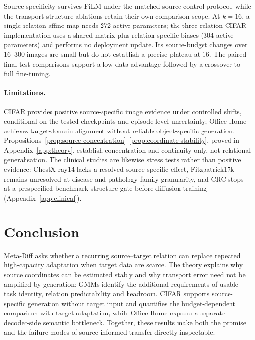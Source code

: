 \documentclass{article}
\begin{document}
Source specificity survives FiLM under the matched source-control protocol, while the transport-structure ablations retain their own comparison scope. At $k=16$, a single-relation affine map needs 272 active parameters; the three-relation CIFAR implementation uses a shared matrix plus relation-specific biases (304 active parameters) and performs no deployment update. Its source-budget changes over 16--300 images are small but do not establish a precise plateau at 16. The paired final-test comparisons support a low-data advantage followed by a crossover to full fine-tuning.

\paragraph{Limitations.}
CIFAR provides positive source-specific image evidence under controlled shifts, conditional on the tested checkpoints and episode-level uncertainty; Office-Home achieves target-domain alignment without reliable object-specific generation. Propositions~\ref{prop:source-concentration}--\ref{prop:coordinate-stability}, proved in Appendix~\ref{app:theory}, establish concentration and continuity only, not relational generalisation. The clinical studies are likewise stress tests rather than positive evidence: ChestX-ray14 lacks a resolved source-specific effect, Fitzpatrick17k remains unresolved at disease and pathology-family granularity, and CRC stops at a prespecified benchmark-structure gate before diffusion training (Appendix~\ref{app:clinical}).

\section{Conclusion}
Meta-Diff asks whether a recurring source--target relation can replace repeated high-capacity adaptation when target data are scarce. The theory explains why source coordinates can be estimated stably and why transport error need not be amplified by generation; GMMs identify the additional requirements of usable task identity, relation predictability and headroom. CIFAR supports source-specific generation without target input and quantifies the budget-dependent comparison with target adaptation, while Office-Home exposes a separate decoder-side semantic bottleneck. Together, these results make both the promise and the failure modes of source-informed transfer directly inspectable.



\end{document}
